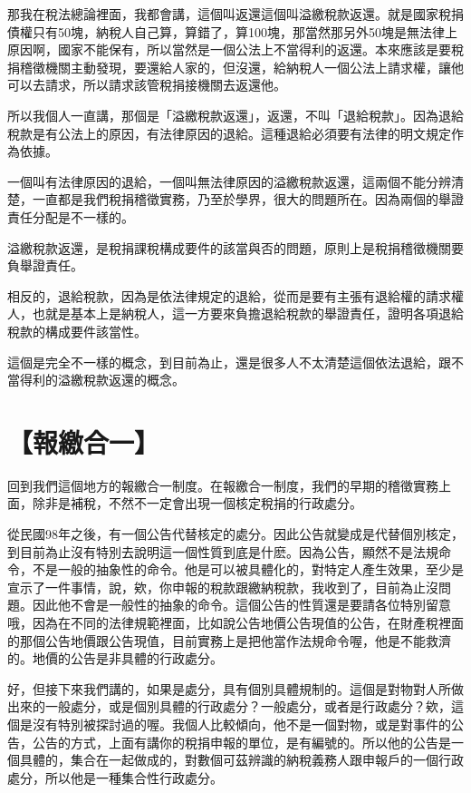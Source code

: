 \documentclass[]{ctexbook}
\begin{document}
那我在稅法總論裡面，我都會講，這個叫返還這個叫溢繳稅款返還。就是國家稅捐債權只有50塊，納稅人自己算，算錯了，算100塊，那當然那另外50塊是無法律上原因啊，國家不能保有，所以當然是一個公法上不當得利的返還。本來應該是要稅捐稽徵機關主動發現，要還給人家的，但沒還，給納稅人一個公法上請求權，讓他可以去請求，所以請求該管稅捐接機關去返還他。

所以我個人一直講，那個是「溢繳稅款返還」，返還，不叫「退給稅款」。因為退給稅款是有公法上的原因，有法律原因的退給。這種退給必須要有法律的明文規定作為依據。

一個叫有法律原因的退給，一個叫無法律原因的溢繳稅款返還，這兩個不能分辨清楚，一直都是我們稅捐稽徵實務，乃至於學界，很大的問題所在。因為兩個的舉證責任分配是不一樣的。

溢繳稅款返還，是稅捐課稅構成要件的該當與否的問題，原則上是稅捐稽徵機關要負舉證責任。

相反的，退給稅款，因為是依法律規定的退給，從而是要有主張有退給權的請求權人，也就是基本上是納稅人，這一方要來負擔退給稅款的舉證責任，證明各項退給稅款的構成要件該當性。

這個是完全不一樣的概念，到目前為止，還是很多人不太清楚這個依法退給，跟不當得利的溢繳稅款返還的概念。

\hypertarget{ux5831ux7e73ux5408ux4e00}{%
\section{【報繳合一】}\label{ux5831ux7e73ux5408ux4e00}}

回到我們這個地方的報繳合一制度。在報繳合一制度，我們的早期的稽徵實務上面，除非是補稅，不然不一定會出現一個核定稅捐的行政處分。

從民國98年之後，有一個公告代替核定的處分。因此公告就變成是代替個別核定，到目前為止沒有特別去說明這一個性質到底是什麽。因為公告，顯然不是法規命令，不是一般的抽象性的命令。他是可以被具體化的，對特定人產生效果，至少是宣示了一件事情，說，欸，你申報的稅款跟繳納稅款，我收到了，目前為止沒問題。因此他不會是一般性的抽象的命令。這個公告的性質還是要請各位特別留意哦，因為在不同的法律規範裡面，比如說公告地價公告現值的公告，在財產稅裡面的那個公告地價跟公告現值，目前實務上是把他當作法規命令喔，他是不能救濟的。地價的公告是非具體的行政處分。

好，但接下來我們講的，如果是處分，具有個別具體規制的。這個是對物對人所做出來的一般處分，或是個別具體的行政處分？一般處分，或者是行政處分？欸，這個是沒有特別被探討過的喔。我個人比較傾向，他不是一個對物，或是對事件的公告，公告的方式，上面有講你的稅捐申報的單位，是有編號的。所以他的公告是一個具體的，集合在一起做成的，對數個可茲辨識的納稅義務人跟申報戶的一個行政處分，所以他是一種集合性行政處分。
\end{document}
